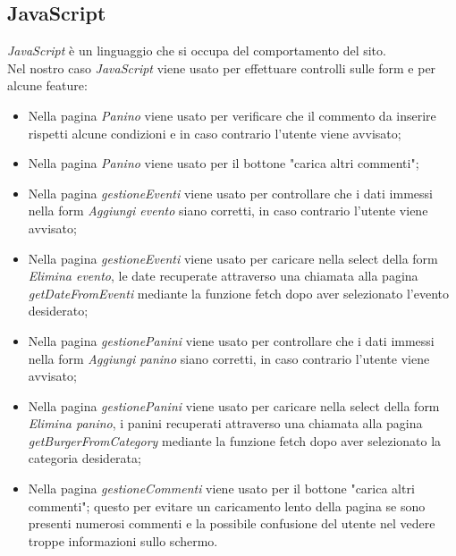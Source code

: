\subsection{JavaScript}
\emph{JavaScript} è un linguaggio che si occupa del comportamento del sito.\\
Nel nostro caso \emph{JavaScript} viene usato per effettuare controlli sulle form e per alcune feature:
\begin{itemize}
    \item Nella pagina \emph{Panino} viene usato per verificare che il commento da inserire rispetti alcune condizioni e in caso contrario l'utente viene avvisato;
    \item Nella pagina \emph{Panino} viene usato per il bottone "carica altri commenti";
    \item Nella pagina \emph{gestioneEventi} viene usato per controllare che i dati immessi nella form \emph{Aggiungi evento} siano corretti, in caso contrario l'utente viene avvisato;
    \item Nella pagina \emph{gestioneEventi} viene usato per caricare nella select della form \emph{Elimina evento}, le date recuperate attraverso una chiamata alla pagina \emph{getDateFromEventi} mediante la funzione fetch dopo aver selezionato l'evento desiderato;
    \item Nella pagina \emph{gestionePanini} viene usato per controllare che i dati immessi nella form \emph{Aggiungi panino} siano corretti, in caso contrario l'utente viene avvisato;
    \item Nella pagina \emph{gestionePanini} viene usato per caricare nella select della form \emph{Elimina panino}, i panini recuperati attraverso una chiamata alla pagina \emph{getBurgerFromCategory} mediante la funzione fetch dopo aver selezionato la categoria desiderata;
    \item Nella pagina \emph{gestioneCommenti} viene usato per il bottone "carica altri commenti"; questo per evitare un caricamento lento della pagina se sono presenti numerosi commenti e la possibile confusione del utente nel vedere troppe informazioni sullo schermo.
\end{itemize}